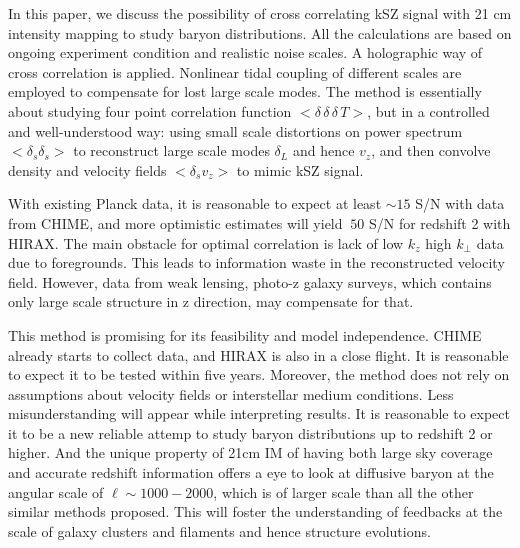 In this paper, we discuss the possibility of cross correlating kSZ signal with 
21 cm intensity mapping to study baryon distributions. 
All the calculations are based on ongoing experiment condition and realistic noise scales. 
A holographic way of cross correlation is applied. 
Nonlinear tidal coupling of different scales are employed to compensate for 
lost large scale modes. 
The method is essentially about studying four point correlation function 
$<\delta\,\delta\,\delta\, T>$, 
but in a controlled and well-understood way: 
using small scale distortions on power spectrum $<\delta_s \delta_s>$ 
to reconstruct large scale modes $\delta_L$ and hence $v_z$, 
and then 
convolve density and velocity fields $<\delta_s v_z> $ to mimic kSZ
 signal. 

With existing Planck data, 
it is reasonable to expect at least $\sim15$ S/N with data from CHIME, 
and more optimistic estimates will yield $~50$ S/N for redshift 2 with HIRAX. 
The main obstacle for optimal correlation 
is lack of low $k_z$ high $k_\perp$ data due to foregrounds. 
This leads to information waste in the reconstructed velocity field. 
However, data from weak lensing, photo-z galaxy surveys, which 
contains only large scale structure in z direction, may 
compensate for that. 
 
This method is promising for its feasibility and model independence. 
CHIME already starts to collect data, 
and HIRAX is also in a close flight. 
It is reasonable to expect it to be tested within five years. 
Moreover, the method does not rely on assumptions about velocity fields 
or interstellar medium conditions. 
Less misunderstanding will appear while interpreting results. 
It is reasonable to expect it to be a new 
reliable attemp to study baryon distributions up to 
redshift 2 or higher. 
And the unique property of 21cm IM of having both large sky coverage and 
accurate redshift information 
offers a eye to look at diffusive baryon 
at the angular scale of $\ell\sim 1000-2000$, 
which is of larger scale than all the other similar methods 
proposed. 
This will foster the understanding of feedbacks at the scale of 
galaxy clusters and filaments 
and hence structure evolutions.
